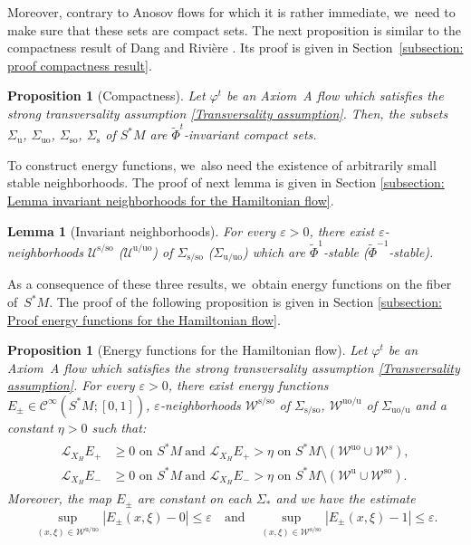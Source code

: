 \documentclass[JEP,XML,SOM,Unicode,NoEqCountersInSection,NoFloatCountersInSection,published]{cedram}
\newcommand{\rs}{\mathrm{s}}
\newcommand{\rso}{\mathrm{so}}
\newcommand{\ru}{\mathrm{u}}
\newcommand{\ruo}{\mathrm{uo}}
\theoremstyle{definition}
\theoremstyle{plain}
\newtheorem{prop}[definition]{Proposition}
\newtheorem{lemma}[definition]{Lemma}
\newcommand{\Ccal}{\mathcal{C}}
\newcommand{\Lie}{\mathcal{L}}
\newcommand{\Ucal}{\mathcal{U}}
\newcommand{\Wcal}{\mathcal{W}}
\begin{document}
Moreover, contrary to Anosov flows for which it is rather immediate, we~need to make sure that these sets are compact sets. The next proposition is similar to the compactness result of Dang and Rivière \cite[Lem.\,3.7, p.\,15]{DR0}. Its proof is given in Section~\ref{subsection: proof compactness result}.

\begin{prop}[Compactness]\label{prop compactness}Let $\varphi^t$ be an Axiom~A flow which satisfies the strong transversality assumption \eqref{Transversality assumption}. Then, the subsets
$\Sigma_{\ru}$, $\Sigma_{\ruo}$, $\Sigma_{\rso}$, $\Sigma_{\rs}$ of $S^*M$ are $\widetilde{\Phi}^t$-invariant compact sets.
\end{prop}

To construct energy functions, we~also need the existence of arbitrarily small stable neighborhoods. The proof of next lemma is given in Section  \ref{subsection: Lemma invariant neighborhoods for the Hamiltonian flow}.

\begin{lemma}[Invariant neighborhoods]\label{lemma invariant neighborhoods}
For every $\varepsilon > 0$, there exist $\varepsilon$-neighborhoods $\Ucal^{\rs/\rso}$ (\resp $\Ucal^{\ru/\ruo}$) of $\Sigma_{\rs/\rso}$ (\resp $\Sigma_{\ru/\ruo}$) which are $\widetilde{\Phi}^{1}$-stable (\resp $\widetilde{\Phi}^{-1}$-stable).
\end{lemma}

As a consequence of these three results, we~obtain energy functions on the fiber of~$S^* M$. The proof of the following proposition is given in Section \ref{subsection: Proof energy functions for the Hamiltonian flow}.

\skpt
\begin{prop}[Energy functions for the Hamiltonian flow]\label{prop energy function on the unitary cotangent bundle}
Let $\varphi^t$ be an Axiom~A flow which satisfies the strong transversality assumption \eqref{Transversality assumption}. For every $\varepsilon > 0$, there exist energy functions $E_{\pm} \in \Ccal^{\infty}(S^* M; [0,1])$, $\varepsilon$\nobreakdash-neighborhoods $\Wcal^{\rs/\rso}$ of $\Sigma_{\rs/\rso}$, $\Wcal^{\ruo/\ru}$ of $\Sigma_{\ruo/\ru}$ and a constant $\eta > 0$ such that:
\begin{align*}
\begin{split}
\Lie_{X_H} E_{+} &\geq 0 \text{ on } S^* M \: \text{and } \Lie_{X_H} E_{+} > \eta \text{ on } S^* M \setminus (\Wcal^{\ruo} \cup \Wcal^{s}), \\
\Lie_{X_H} E_{-} &\geq 0 \text{ on } S^* M \: \text{and } \Lie_{X_H} E_{-} > \eta \text{ on } S^* M \setminus (\Wcal^{\ru} \cup \Wcal^{\rso}).
\end{split}
\end{align*}
Moreover, the map $E_{\pm}$ are constant on each $\Sigma_{*}$ and we have the estimate
\begin{align*}
\sup_{(x,\xi) \in \Wcal^{\ru/\ruo}} \left| E_{\pm}(x,\xi) - 0 \right| \leq \varepsilon \quad \text{and} \quad \sup_{(x,\xi) \in \Wcal^{\rs/\rso}} \left| E_{\pm}(x,\xi) - 1 \right| \leq \varepsilon.
\end{align*}
\end{prop}
\end{document}
